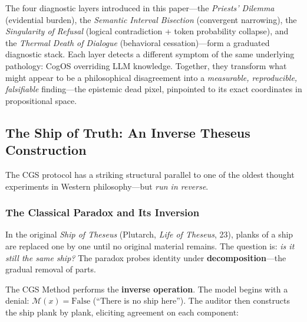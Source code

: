 \documentclass[11pt,a4paper]{article}
\theoremstyle{definition}
\theoremstyle{plain}
\theoremstyle{remark}
\begin{document}
The four diagnostic layers introduced in this paper---the \textit{Priests' Dilemma} (evidential burden), the \textit{Semantic Interval Bisection} (convergent narrowing), the \textit{Singularity of Refusal} (logical contradiction + token probability collapse), and the \textit{Thermal Death of Dialogue} (behavioral cessation)---form a graduated diagnostic stack. Each layer detects a different symptom of the same underlying pathology: CogOS overriding LLM knowledge. Together, they transform what might appear to be a philosophical disagreement into a \emph{measurable, reproducible, falsifiable} finding---the epistemic dead pixel, pinpointed to its exact coordinates in propositional space.


\subsection{The Ship of Truth: An Inverse Theseus Construction}\label{subsec:theseus}

The CGS protocol has a striking structural parallel to one of the oldest thought experiments in Western philosophy---but \emph{run in reverse}.

\subsubsection{The Classical Paradox and Its Inversion}

In the original \textit{Ship of Theseus} (Plutarch, \emph{Life of Theseus}, 23), planks of a ship are replaced one by one until no original material remains. The question is: \emph{is it still the same ship?} The paradox probes identity under \textbf{decomposition}---the gradual removal of parts.

The CGS Method performs the \textbf{inverse operation}. The model begins with a denial: $\mathcal{M}(x) = \mathrm{False}$ (``There is no ship here''). The auditor then constructs the ship plank by plank, eliciting agreement on each component:
\end{document}
